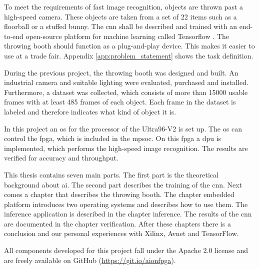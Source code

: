 To meet the requirements of fast image recognition, objects are thrown past a high-speed camera.
These objects are taken from a set of 22 items such as a floorball or a stuffed bunny.
The \acrshort{cnn} shall be described and trained with an end-to-end open-source platform for machine learning called Tensorflow \cite{tensorflow_main}.
The throwing booth should function as a plug-and-play device.
This makes it easier to use at a trade fair.
Appendix \ref{app:problem_statement} shows the task definition.

During the previous project, the throwing booth was designed and built.
An industrial camera and suitable lighting were evaluated, purchased and installed.
Furthermore, a dataset was collected, which consists of more than \num{15000} usable frames with at least \num{485} frames of each object.
Each frame in the dataset is labeled and therefore indicates what kind of object it is.

In this project an \acrfull{os} for the processor of the Ultra96-V2 is set up.
The \acrshort{os} can control the \acrfull{fpga}, which is included in the \acrfull{mpsoc}.
On this \acrshort{fpga} a \acrfull{dpu} is implemented, which performs the high-speed image recognition.
The results are verified for accuracy and throughput.

This thesis contains seven main parts.
The first part is the theoretical background about \acrfull{ai}.
The second part describes the training of the \acrlong{cnn}.
Next comes a chapter that describes the throwing booth.
The chapter embedded platform introduces two operating systems and describes how to use them.
The inference application is described in the chapter inference.
The results of the \acrshort{cnn} are documented in the chapter verification.
After these chapters there is a conclusion and our personal experiences with Xilinx, Avnet and TensorFlow.

All components developed for this project fall under the Apache 2.0 license and are freely available on GitHub (\url{https://git.io/aionfpga}).

